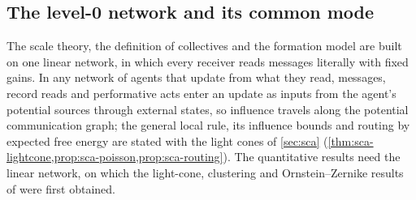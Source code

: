 \subsection{The level-0 network and its common mode}\label{sec:fw-level0}

The scale theory, the definition of collectives and the formation model are built on one linear network, in which every receiver reads messages literally with fixed gains. In any network of agents that update from what they read, messages, record reads and performative acts enter an update as inputs from the agent's potential sources through external states, so influence travels along the potential communication graph; the general local rule, its influence bounds and routing by expected free energy are stated with the light cones of \cref{sec:sca} (\cref{thm:sca-lightcone,prop:sca-poisson,prop:sca-routing}). The quantitative results need the linear network, on which the light-cone, clustering and Ornstein--Zernike results of \citet{dennis2026communicating} were first obtained.

